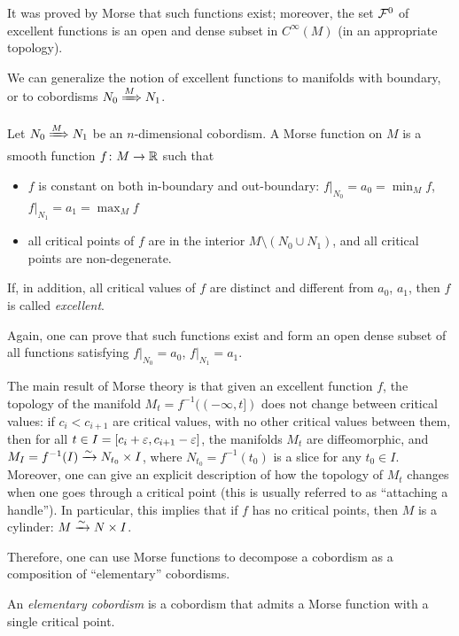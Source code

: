 It was proved by Morse that such functions exist; moreover, the set $\mathcal{F}^0$
of excellent functions is an open and dense subset in $C^\infty(M)$
(in an appropriate topology).

We can generalize the notion of excellent functions to manifolds with boundary,
or to cobordisms $N_0\xRightarrow{M} N_1$.

\begin{definition}\label{d:morse-function3}
  Let $N_0\xRightarrow{M} N_1$ be an $n$-dimensional cobordism. A Morse function on $M$
  is a smooth function $f\colon M\to \mathbb{R}$ such that
  \begin{itemize}
    \item $f$ is constant on both in-boundary and out-boundary:
      $f|_{N_0}=a_0=\min_M f$, $f|_{N_1}=a_1=\max_M f$
    \item all critical points of $f$ are in the interior
      $M\setminus (N_0\cup N_1)$, and all critical points are non-degenerate.
  \end{itemize}
  If, in addition, all critical values of $f$ are distinct and different from
  $a_0$, $a_1$, then $f$ is called \emph{excellent}.
\end{definition}
 Again, one can prove
that such functions exist and form an open dense subset of all functions
satisfying $f|_{N_0}=a_0$, $f|_{N_1}=a_1$.

The main result of Morse theory is that given an excellent function $f$, the
topology of the manifold $M_t=f^{-1}((-\infty, t])$ does not change between
critical values: if $c_i<c_{i+1}$ are critical values, with no other critical
values between them, then for all $t\in I=[c_i+\varepsilon, c_{i+1}-\varepsilon]$, the
manifolds $M_t$ are diffeomorphic, and $M_I=f^{-1}(I)\xrightarrow{\sim} N_{t_0} \times I$,
where $N_{t_0}=f^{-1}(t_0)$ is a slice for any $t_0\in I$. Moreover, one can
give an explicit description of how the topology of $M_t$ changes when one goes
through a critical point (this is usually referred to as ``attaching a
handle''). In particular, this implies that if $f$ has no critical points, then
$M$ is a cylinder: $M\xrightarrow{\sim} N\times I$.

Therefore, one can use Morse functions to decompose a cobordism as a
composition of ``elementary'' cobordisms.
\begin{definition}\label{d:elem-cobordism}
  An \emph{elementary cobordism} is a cobordism that admits a Morse function
  with a single critical point.
\end{definition}

